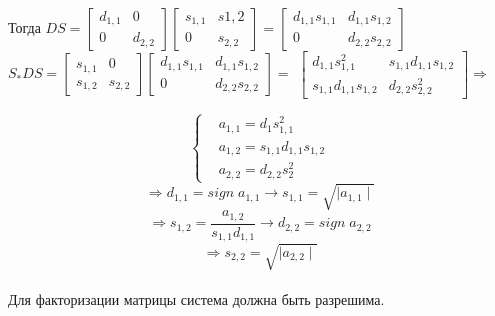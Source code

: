 \documentclass[oneside, final, 14pt]{extreport}
\begin{document}
\\
Тогда \( DS=\begin{bmatrix} d_{1,1} & 0 \\ 0 & d_{2,2} \end{bmatrix}  \begin{bmatrix} s_{1,1} & s{1,2}\\ 0 & s_{2,2}\end{bmatrix}=\begin{bmatrix}d_{1,1}s_{1,1} & d_{1,1}s_{1,2} \\ 0 & d_{2,2}s_{2,2} \end{bmatrix}\)
\\
\(S_{*}DS=\begin{bmatrix} s_{1,1} & 0 \\ s_{1,2} & s_{2,2}\end{bmatrix} \begin{bmatrix} d_{1,1}s_{1,1} & d_{1,1}s_{1,2} \\ 0 & d_{2,2}s_{2,2}\end{bmatrix} = \)
\( \begin{bmatrix} d_{1,1}s_{1,1}^2 & s_{1,1}d_{1,1}s_{1,2} \\ s_{1,1}d_{1,1}s_{1,2} & d_{2,2}s_{2,2}^2 \end{bmatrix} \Rightarrow\)

\[  \left\{\begin{aligned} & a_{1,1}=d_1s_{1,1}^2 \\ & a_{1,2}=s_{1,1}d_{1,1}s_{1,2} \\ & a_{2,2}=d_{2,2}s_2^2\end{aligned}\right. \]
\[\Rightarrow d_{1,1}=sign\;a_{1,1} \rightarrow s_{1,1}=\sqrt{ \mid a_{1,1} \mid }  \]
\[\Rightarrow s_{1,2}=\frac{a_{1,2}}{s_{1,1}d_{1,1}} \rightarrow d_{2,2}= sign \; a_{2,2} \]
\[\Rightarrow s_{2,2}=\sqrt{\mid a_{2,2}\mid}\]
\\
Для факторизации матрицы система должна быть разрешима.
\end{document}
